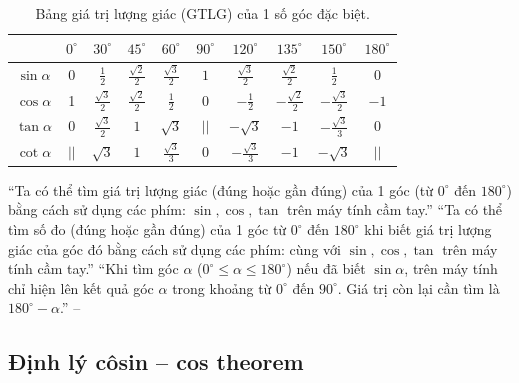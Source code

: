 \documentclass[oneside]{book}
\numberwithin{equation}{section}
\begin{document}
\begin{table}[H]
	\centering
	\begin{tabular}{|c|c|c|c|c|c|c|c|c|c|}
		\hline
		\diagbox{GTLG}{$\alpha$}& $0^\circ$ & $30^\circ$ & $45^\circ$ & $60^\circ$ & $90^\circ$ & $120^\circ$ & $135^\circ$ & $150^\circ$ & $180^\circ$ \\
		\hline
		$\sin\alpha$ & 0 & $\frac{1}{2}$ & $\frac{\sqrt{2}}{2}$ & $\frac{\sqrt{3}}{2}$ & $1$ & $\frac{\sqrt{3}}{2}$ & $\frac{\sqrt{2}}{2}$ & $\frac{1}{2}$ & $0$ \\
		\hline
		$\cos\alpha$ & 1 & $\frac{\sqrt{3}}{2}$ & $\frac{\sqrt{2}}{2}$ & $\frac{1}{2}$ & 0 & $-\frac{1}{2}$ & $-\frac{\sqrt{2}}{2}$ & $-\frac{\sqrt{3}}{2}$ & $-1$ \\
		\hline
		$\tan\alpha$ & 0 & $\frac{\sqrt{3}}{2}$ & $1$ & $\sqrt{3}$ & $||$ & $-\sqrt{3}$ & $-1$ & $-\frac{\sqrt{3}}{3}$ & $0$ \\
		\hline
		$\cot\alpha$ & $||$ & $\sqrt{3}$ & $1$ & $\frac{\sqrt{3}}{3}$ & $0$ & $-\frac{\sqrt{3}}{3}$ & $-1$ & $-\sqrt{3}$ & $||$ \\
		\hline
	\end{tabular}
	\caption{Bảng giá trị lượng giác (GTLG) của 1 số góc đặc biệt.}
\end{table}
``Ta có thể tìm giá trị lượng giác (đúng hoặc gần đúng) của 1 góc (từ $0^\circ$ đến $180^\circ$) bằng cách sử dụng các phím: $\boxed{\sin},\boxed{\cos},\boxed{\tan}$ trên máy tính cầm tay.'' ``Ta có thể tìm số đo (đúng hoặc gần đúng) của 1 góc từ $0^\circ$ đến $180^\circ$ khi biết giá trị lượng giác của góc đó bằng cách sử dụng các phím:  cùng với $\boxed{\sin},\boxed{\cos},\boxed{\tan}$ trên máy tính cầm tay.'' ``Khi tìm góc $\alpha$ ($0^\circ\le\alpha\le 180^\circ$) nếu đã biết $\sin\alpha$, trên máy tính chỉ hiện lên kết quả góc $\alpha$ trong khoảng từ $0^\circ$ đến $90^\circ$. Giá trị còn lại cần tìm là $180^\circ - \alpha$.'' -- \cite[p. 66]{SGK_Toan_10_Canh_Dieu_tap_1}

\subsection{Định lý côsin -- cos theorem}
\end{document}
